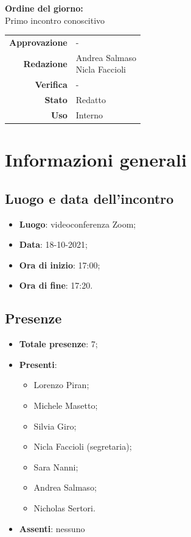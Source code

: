 \documentclass[11pt]{article}
\begin{document}
\begin{titlepage}
\begin{center}
			\large
			
			\vfill
			\textbf{Ordine del giorno:} \\
			Primo incontro conoscitivo
			
			
			\vfill
			
			
			\begin{tabular}{r|l}
				\textbf{Approvazione} &  -\\
				\textbf{Redazione} &  \parbox[t]{5cm}{Andrea Salmaso \\Nicla Faccioli}\\
				\textbf{Verifica} &  -\\
				\textbf{Stato} & Redatto \\
				\textbf{Uso} & Interno
			\end{tabular}
			\vfill
			
		\end{center}
	\end{titlepage}

	\section{Informazioni generali}
	\subsection{Luogo e data dell'incontro}
	\begin{itemize}
		\item \textbf{Luogo}: videoconferenza Zoom;
		\item \textbf{Data}: 18-10-2021;
		\item \textbf{Ora di inizio}: 17:00;
		\item \textbf{Ora di fine}: 17:20.
	\end{itemize}
	
	\subsection{Presenze}
	\begin{itemize}
		\item \textbf{Totale presenze}: 7;
		\item \textbf{Presenti}:
		\begin{itemize}
			\item Lorenzo Piran; 
			\item Michele Masetto;
			\item Silvia Giro;
			\item Nicla Faccioli (segretaria);
			\item Sara Nanni;
			\item Andrea Salmaso;
			\item Nicholas Sertori.
		\end{itemize}
		\item \textbf{Assenti}: nessuno
	\end{itemize}
\end{document}
